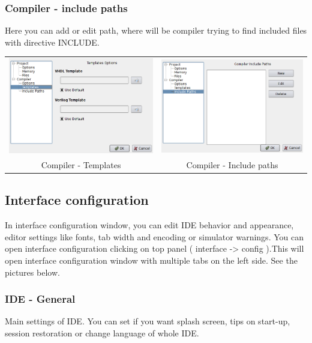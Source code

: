         \subsubsection{Compiler - include paths}
            Here you can add or edit path, where will be compiler trying to find included files with directive INCLUDE. 

        \begin{table}[h!]       
            \begin{tabular}{cc}
                \includegraphics[width=.5\textwidth]{img/NewImg/config5.png}
                    &
                \includegraphics[width=.5\textwidth]{img/NewImg/config6.png}
                    \\
                Compiler - Templates & Compiler - Include paths
            \end{tabular}
            \end{table}

\subsection{Interface configuration}
    In interface configuration window, you can edit IDE behavior and appearance, editor settings like fonts, tab width and encoding or simulator warnings.
    You can open interface configuration clicking on top panel ( interface -> config ).This will open interface configuration window with
    multiple tabs on the left side. See the pictures below.

    \subsubsection{IDE - General}
        Main settings of IDE. You can set if you want splash screen, tips on start-up, session restoration or change language of whole IDE.

